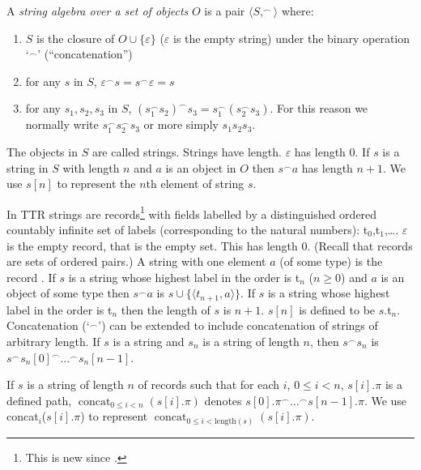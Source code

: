 A \textit{string algebra over a set of objects} $O$ is a pair $\langle S,
^{\frown}\rangle$ where:
\begin{enumerate} 
 
\item $S$ is the closure of $O\cup\{\varepsilon\}$ ($\varepsilon$ is the empty string) under the binary operation `$^{\frown}$' (``concatenation'') 
 
\item for any $s$ in $S$, $\varepsilon^{\frown}s = s^{\frown}\varepsilon = s$

\item for any $s_1,s_2,s_3$ in $S$,
  $(s_1^{\frown}s_2)^{\frown}s_3=s_1^{\frown}(s_2^{\frown}s_3)$.  For
  this reason we normally write $s_1^{\frown}s_2^{\frown}s_3$ or more
  simply $s_1s_2s_3$.
 
\end{enumerate}

The objects in $S$ are called strings.  Strings have length.  $\varepsilon$ has
length 0.  If $s$ is a string in $S$
with length $n$ and $a$ is an object in $O$ then $s^{\frown}a$ has
length $n+1$.  We use $s[n]$ to represent the $n$th element of string
$s$.

In TTR strings are records\footnote{This is new since \cite{Cooper2012}.} with fields labelled by a distinguished
ordered countably infinite set of labels (corresponding to the natural
numbers):  t$_0$,t$_1$,\ldots.  $\varepsilon$ is the empty record,
that is the empty set.  This has length 0.  (Recall that records are sets of ordered
pairs.)  A string with one element $a$ (of some type) is the
record . If $s$ is a string whose
highest label in the order is t$_n$ ($n\geq 0$) and $a$ is an object of
some type then $s^{\frown}a$ is $s\cup\{\langle t_{n+1},a\rangle\}$.  If
$s$ is a string whose highest label in the order is t$_n$ then the
length of $s$ is $n+1$.  $s[n]$ is defined to be $s$.t$_n$.
Concatenation (`$^{\frown}$') can be extended to include concatenation
of strings of arbitrary length.  If $s$ is a string and $s_n$ is a
string of length $n$, then $s^{\frown}s_n$ is
$s^{\frown}s_n[0]^{\frown}\ldots^{\frown}s_n[n-1]$. 

If $s$ is a string of length $n$ of records such that for each $i$,
$0\leq i<n$, $s[i].\pi$ is a defined path, 
$\displaystyle\mathop{\mathrm{concat}}_{0\leq i<n}(s[i].\pi)$ denotes
$s[0].\pi^{\frown}\ldots^{\frown}s[n-1].\pi$.  We use
concat$_i$($s[i].\pi$) to represent $\displaystyle\mathop{\mathrm{concat}}_{0\leq i<\mathrm{length}(s)}(s[i].\pi)$.

